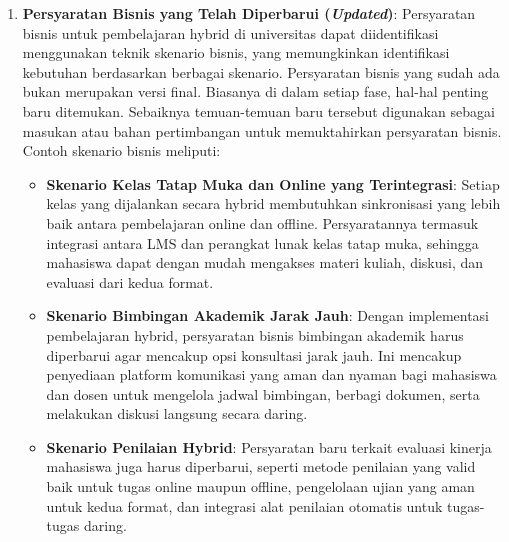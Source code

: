 \begin{enumerate}
	\item \textbf{Persyaratan Bisnis yang Telah Diperbarui (\textit{Updated})}:  
	Persyaratan bisnis untuk pembelajaran hybrid di universitas dapat diidentifikasi menggunakan teknik skenario bisnis, yang memungkinkan identifikasi kebutuhan berdasarkan berbagai skenario. Persyaratan bisnis yang sudah ada bukan merupakan versi final. Biasanya di dalam setiap fase, hal-hal penting baru ditemukan. Sebaiknya temuan-temuan baru tersebut digunakan sebagai masukan atau bahan pertimbangan untuk memuktahirkan persyaratan bisnis.  Contoh skenario bisnis meliputi:
	\begin{itemize}
		\item \textbf{Skenario Kelas Tatap Muka dan Online yang Terintegrasi}: Setiap kelas yang dijalankan secara hybrid membutuhkan sinkronisasi yang lebih baik antara pembelajaran online dan offline. Persyaratannya termasuk integrasi antara LMS dan perangkat lunak kelas tatap muka, sehingga mahasiswa dapat dengan mudah mengakses materi kuliah, diskusi, dan evaluasi dari kedua format.
		\item \textbf{Skenario Bimbingan Akademik Jarak Jauh}: Dengan implementasi pembelajaran hybrid, persyaratan bisnis bimbingan akademik harus diperbarui agar mencakup opsi konsultasi jarak jauh. Ini mencakup penyediaan platform komunikasi yang aman dan nyaman bagi mahasiswa dan dosen untuk mengelola jadwal bimbingan, berbagi dokumen, serta melakukan diskusi langsung secara daring.
		\item \textbf{Skenario Penilaian Hybrid}: Persyaratan baru terkait evaluasi kinerja mahasiswa juga harus diperbarui, seperti metode penilaian yang valid baik untuk tugas online maupun offline, pengelolaan ujian yang aman untuk kedua format, dan integrasi alat penilaian otomatis untuk tugas-tugas daring.
	\end{itemize}
	

\end{enumerate}
